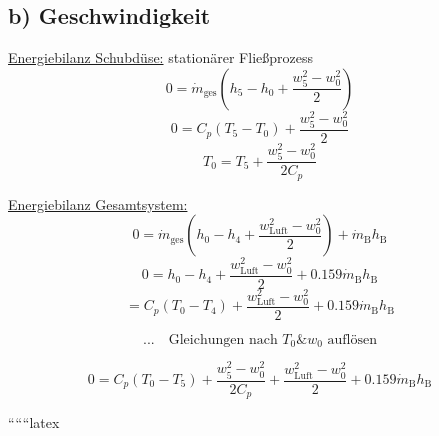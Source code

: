 \subsection*{b) Geschwindigkeit}

\underline{Energiebilanz Schubdüse:} stationärer Fließprozess
\[
0 = \dot{m}_{\text{ges}} \left( h_5 - h_0 + \frac{w_5^2 - w_0^2}{2} \right)
\]
\[
0 = C_p \left( T_5 - T_0 \right) + \frac{w_5^2 - w_0^2}{2}
\]
\[
T_0 = T_5 + \frac{w_5^2 - w_0^2}{2 C_p}
\]

\underline{Energiebilanz Gesamtsystem:}
\[
0 = \dot{m}_{\text{ges}} \left( h_0 - h_4 + \frac{w_{\text{Luft}}^2 - w_0^2}{2} \right) + \dot{m}_{\text{B}} h_{\text{B}}
\]
\[
0 = h_0 - h_4 + \frac{w_{\text{Luft}}^2 - w_0^2}{2} + 0.159 \dot{m}_{\text{B}} h_{\text{B}}
\]
\[
= C_p \left( T_0 - T_4 \right) + \frac{w_{\text{Luft}}^2 - w_0^2}{2} + 0.159 \dot{m}_{\text{B}} h_{\text{B}}
\]

\[
\text{...} \quad \text{Gleichungen nach } T_0 \& w_0 \text{ auflösen}
\]

\[
0 = C_p \left( T_0 - T_5 \right) + \frac{w_5^2 - w_0^2}{2 C_p} + \frac{w_{\text{Luft}}^2 - w_0^2}{2} + 0.159 \dot{m}_{\text{B}} h_{\text{B}}
\]

``````latex